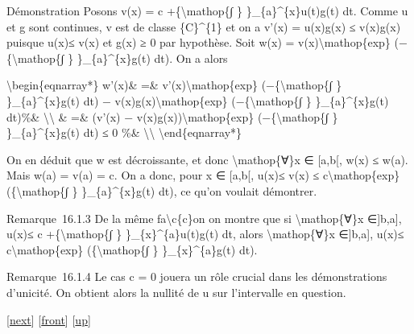 \documentclass[]{article}
\begin{document}
Démonstration Posons v(x) = c +\{\textbackslash{}mathop\{∫ \}
\}\_\{a\}\^{}\{x\}\textbar{}u(t)\textbar{}g(t) dt. Comme u et g sont
continues, v est de classe \{C\}\^{}\{1\} et on a v'(x) =
\textbar{}u(x)\textbar{}g(x) ≤ v(x)g(x) puisque
\textbar{}u(x)\textbar{}≤ v(x) et g(x) ≥ 0 par hypothèse. Soit w(x) =
v(x)\textbackslash{}mathop\{exp\} (−\{\textbackslash{}mathop\{∫ \}
\}\_\{a\}\^{}\{x\}g(t) dt). On a alors

\textbackslash{}begin\{eqnarray*\} w'(x)\& =\&
v'(x)\textbackslash{}mathop\{exp\} (−\{\textbackslash{}mathop\{∫ \}
\}\_\{a\}\^{}\{x\}g(t) dt) − v(x)g(x)\textbackslash{}mathop\{exp\}
(−\{\textbackslash{}mathop\{∫ \} \}\_\{a\}\^{}\{x\}g(t) dt)\%\&
\textbackslash{}\textbackslash{} \& =\& (v'(x) −
v(x)g(x))\textbackslash{}mathop\{exp\} (−\{\textbackslash{}mathop\{∫ \}
\}\_\{a\}\^{}\{x\}g(t) dt) ≤ 0 \%\& \textbackslash{}\textbackslash{}
\textbackslash{}end\{eqnarray*\}

On en déduit que w est décroissante, et donc
\textbackslash{}mathop\{∀\}x ∈ {[}a,b{[}, w(x) ≤ w(a). Mais w(a) = v(a)
= c. On a donc, pour x ∈ {[}a,b{[}, \textbar{}u(x)\textbar{}≤ v(x) ≤
c\textbackslash{}mathop\{exp\} (\{\textbackslash{}mathop\{∫ \}
\}\_\{a\}\^{}\{x\}g(t) dt), ce qu'on voulait démontrer.

Remarque~16.1.3 De la même fa\textbackslash{}c\{c\}on on montre que si
\textbackslash{}mathop\{∀\}x ∈{]}b,a{]}, \textbar{}u(x)\textbar{}≤ c
+\{\textbackslash{}mathop\{∫ \}
\}\_\{x\}\^{}\{a\}\textbar{}u(t)\textbar{}g(t) dt, alors
\textbackslash{}mathop\{∀\}x ∈{]}b,a{]}, \textbar{}u(x)\textbar{}≤
c\textbackslash{}mathop\{exp\} (\{\textbackslash{}mathop\{∫ \}
\}\_\{x\}\^{}\{a\}g(t) dt).

Remarque~16.1.4 Le cas c = 0 jouera un rôle crucial dans les
démonstrations d'unicité. On obtient alors la nullité de u sur
l'intervalle en question.

{[}\href{coursse87.html}{next}{]} {[}\href{coursse86.html}{front}{]}
{[}\href{coursch17.html\#coursse86.html}{up}{]}
\end{document}
